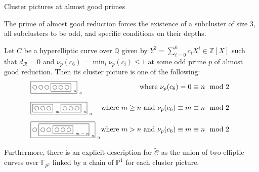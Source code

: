 \documentclass[10pt]{beamer}
\begin{document}
\begin{frame}[t]{Cluster pictures at almost good primes}

The prime of almost good reduction forces the existence of a subcluster of size $ 3 $, all subclusters to be odd, and specific conditions on their depths.

\begin{theorem}[MS25, Corollaries 3.5/7/10/11]
Let $ C $ be a hyperelliptic curve over $ \mathbb{Q} $ given by $ Y^2 = \sum_{i = 0}^6 c_iX^i \in \mathbb{Z}[X] $ such that $ d_\mathcal{R} = 0 $ and $ \nu_p(c_6) = \min_i\nu_p(c_i) \le 1 $ at some odd prime $ p $ of almost good reduction. Then its cluster picture is one of the following:
\begin{align*}
&
\begin{tikzpicture}
\draw (0, 0) rectangle (2.3, -0.6) node[right]{\tiny $ 0 $};
\draw (0.2, -0.3) circle (0.1);
\draw (0.5, -0.3) circle (0.1);
\draw (0.8, -0.3) circle (0.1);
\draw (1, -0.1) rectangle (2, -0.5) node[right]{\tiny $ n $};
\draw (1.2, -0.3) circle (0.1);
\draw (1.5, -0.3) circle (0.1);
\draw (1.8, -0.3) circle (0.1);
\draw (10, -0.3) node[left]{where $ \nu_p(c_6) = 0 \equiv n \mod 2 $};
\end{tikzpicture}
\\ &
\begin{tikzpicture}
\draw (0, 0) rectangle (2.8, -0.6) node[right]{\tiny $ 0 $};
\draw (0.1, -0.1) rectangle (1.1, -0.5) node[right]{\tiny $ m $};
\draw (0.3, -0.3) circle (0.1);
\draw (0.6, -0.3) circle (0.1);
\draw (0.9, -0.3) circle (0.1);
\draw (1.5, -0.1) rectangle (2.5, -0.5) node[right]{\tiny $ n $};
\draw (1.7, -0.3) circle (0.1);
\draw (2, -0.3) circle (0.1);
\draw (2.3, -0.3) circle (0.1);
\draw (10, -0.3) node[left]{where $ m \ge n $ and $ \nu_p(c_6) \equiv m \equiv n \mod 2 $};
\end{tikzpicture}
\\ &
\begin{tikzpicture}
\draw (0, 0) rectangle (3.2, -0.8) node[right]{\tiny $ 0 $};
\draw (0.2, -0.4) circle (0.1);
\draw (0.4, -0.1) rectangle (2.9, -0.7) node[right]{\tiny $ n $};
\draw (0.6, -0.4) circle (0.1);
\draw (0.9, -0.4) circle (0.1);
\draw (1.1, -0.2) rectangle (2.1, -0.6) node[right]{\tiny $ m - n $};
\draw (1.3, -0.4) circle (0.1);
\draw (1.6, -0.4) circle (0.1);
\draw (1.9, -0.4) circle (0.1);
\draw (10, -0.4) node[left]{where $ m > n $ and $ \nu_p(c_6) \equiv m \equiv n \mod 2 $};
\end{tikzpicture}
\end{align*}
Furthermore, there is an explicit description for $ \widetilde{\mathcal{C}} $ as the union of two elliptic curves over $ \mathbb{F}_{p^2} $ linked by a chain of $ \mathbb{P}^1 $ for each cluster picture.
\end{theorem}

\end{frame}
\end{document}
